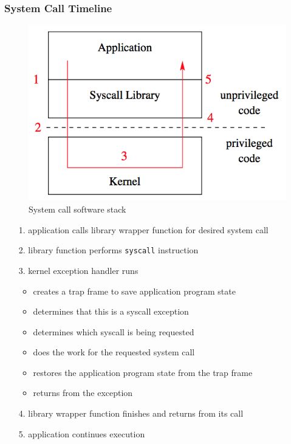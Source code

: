 \documentclass[12pt]{article}
\theoremstyle{plain}
\theoremstyle{definition}
\begin{document}
\subsubsection{System Call Timeline}
\begin{figure}[!ht]
  \centering
  \includegraphics[scale=0.39]{pictures/syscall_stack.png}
  \caption{System call software stack}
  \label{fig:syscall_stack}
\end{figure}
\begin{enumerate}
  \item[1.] application calls library wrapper function for desired system call
  \item[2.] library function performs \texttt{syscall} instruction
  \item[3.] kernel exception handler runs
  \begin{itemize}
    \item creates a trap frame to save application program state
    \item determines that this is a syscall exception
    \item determines which syscall is being requested
    \item does the work for the requested system call
    \item restores the application program state from the trap frame
    \item returns from the exception
  \end{itemize}
  \item[4.] library wrapper function finishes and returns from its call
  \item[5.] application continues execution
\end{enumerate}
\end{document}
